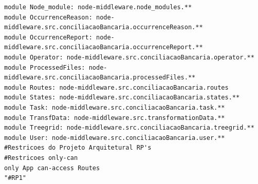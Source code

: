 \documentclass[12pt]{article}
\begin{document}
\begin{lstlisting}[style=colorido, caption={Especificação do Projeto Arquitetural do orquestrador Node-Middle.},label={list:especArquiteturalNodeMiddle}
]
module Node_module: node-middleware.node_modules.**
module OccurrenceReason: node-middleware.src.conciliacaoBancaria.occurrenceReason.**
module OccurrenceReport: node-middleware.src.conciliacaoBancaria.occurrenceReport.**
module Operator: node-middleware.src.conciliacaoBancaria.operator.**
module ProcessedFiles: node-middleware.src.conciliacaoBancaria.processedFiles.**
module Routes: node-middleware.src.conciliacaoBancaria.routes
module States: node-middleware.src.conciliacaoBancaria.states.**
module Task: node-middleware.src.conciliacaoBancaria.task.**
module TransfData: node-middleware.src.transformationData.**
module Treegrid: node-middleware.src.conciliacaoBancaria.treegrid.**
module User: node-middleware.src.conciliacaoBancaria.user.**
#Restricoes do Projeto Arquitetural RP's
#Restricoes only-can
only App can-access Routes 																																																							"#RP1"


\end{lstlisting}
\end{document}
